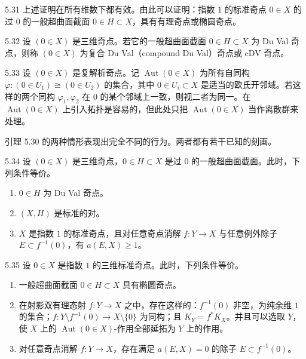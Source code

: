 \begin{remark}{5.31}
上述证明在所有维数下都有效。由此可以证明：指数 $1$ 的标准奇点 $0\in X$ 的过 $0$ 的一般超曲面截面 $0\in H\subset X$，具有有理奇点或椭圆奇点。
\end{remark}

\begin{definition}{5.32}
设 $(0\in X)$ 是三维奇点。若它的一般超曲面截面 $0\in H\subset X$ 为 Du Val 奇点，则称 $(0\in X)$ 为复合 Du Val（compound Du Val）奇点或 cDV 奇点。
\end{definition}

\begin{definition}{5.33}
设 $(0\in X)$ 是复解析奇点。记 $\operatorname{Aut}(0\in X)$ 为所有自同构 $\varphi\colon(0\in U_1)\cong(0\in U_2)$ 的集合，其中 $0\in U_i\subset X$ 是适当的欧氏开邻域。若这样的两个同构 $\varphi_1,\varphi_2$ 在 $0$ 的某个邻域上一致，则视二者为同一。在 $\operatorname{Aut}(0\in X)$ 上引入拓扑是容易的，但此处只把 $\operatorname{Aut}(0\in X)$ 当作离散群来处理。
\end{definition}

引理 5.30 的两种情形表现出完全不同的行为。两者都有若干已知的刻画。

\begin{theorem*}{5.34}
设 $(0\in X)$ 是三维奇点，$0\in H\subset X$ 是过 $0$ 的一般超曲面截面。此时，下列条件等价。
\begin{enumerate}[label=(\arabic*),leftmargin=*]
\item $0\in H$ 为 Du Val 奇点。
\item $(X,H)$ 是标准的对。
\item $X$ 是指数 $1$ 的标准奇点，且对任意奇点消解 $f\colon Y\to X$ 与任意例外除子 $E\subset f^{-1}(0)$，有 $a(E,X)\ge1$。
\end{enumerate}
\end{theorem*}

\begin{theorem*}{5.35}
设 $0\in X$ 是指数 $1$ 的三维标准奇点。此时，下列条件等价。
\begin{enumerate}[label=(\arabic*),leftmargin=*]
\item 一般超曲面截面 $0\in H\subset X$ 具有椭圆奇点。
\item 在射影双有理态射 $f\colon Y\to X$ 之中，存在这样的：$f^{-1}(0)$ 非空，为纯余维 $1$ 的集合；$f\colon Y\setminus f^{-1}(0)\to X\setminus\{0\}$ 为同构；且 $K_Y=f^*K_X$。并且可以选取 $Y$，使 $X$ 上的 $\operatorname{Aut}(0\in X)$-作用全部延拓为 $Y$ 上的作用。
\item 对任意奇点消解 $f\colon Y\to X$，存在满足 $a(E,X)=0$ 的除子 $E\subset f^{-1}(0)$。
\end{enumerate}
\end{theorem*}

